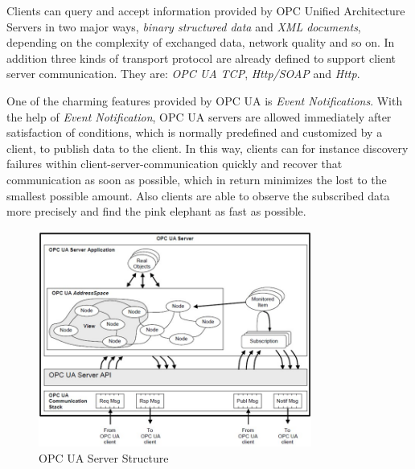Clients can query and accept information provided by OPC Unified Architecture Servers in two major ways, \emph{binary structured data} and \emph{XML documents}, depending on the complexity of exchanged data, network quality and so on. In addition three kinds of transport protocol are already defined to support client server communication. They are: \emph{OPC UA TCP}, \emph{Http/SOAP} and \emph{Http}.    

One of the charming features provided by OPC UA is \emph{Event Notifications}. With the help of \emph{Event Notification}, OPC UA servers are allowed immediately after satisfaction of conditions, which is normally predefined and customized by a client, to publish data to the client. In this way, clients can for instance discovery failures within client-server-communication quickly and recover that communication as soon as possible, which in return minimizes the lost to the smallest possible amount. Also clients are able to observe the subscribed data more precisely and find the pink elephant as fast as possible.


\begin{figure}[!htb]
	\centering
	\includegraphics[width=0.8\textwidth]{server.jpg}
		\caption{OPC UA Server Structure\cite{O1}}
	\label{fig:server}
\end{figure}


